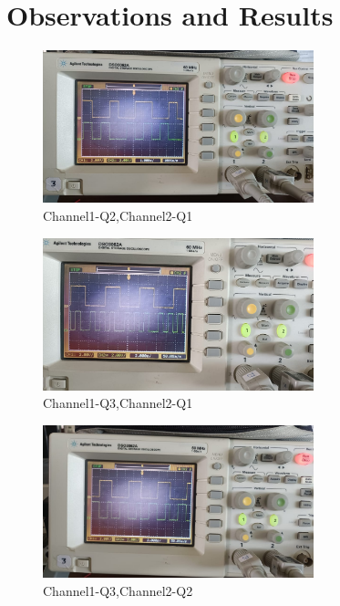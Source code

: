 \documentclass{article}
\begin{document}
\section{Observations and Results}
\begin{figure}[H]
    \centering
    \includegraphics[width=0.7\textwidth]{figs/Q0Q1.jpeg} 
    \caption{Channel1-Q2,Channel2-Q1}
\end{figure}
\begin{figure}[H]
    \centering
    \includegraphics[width=0.7\textwidth]{figs/Q0Q2.jpeg} 
    \caption{Channel1-Q3,Channel2-Q1}
\end{figure}
\begin{figure}[H]
    \centering
    \includegraphics[width=0.7\textwidth]{figs/Q1Q2.jpeg} 
    \caption{Channel1-Q3,Channel2-Q2}
\end{figure}
\end{document}
